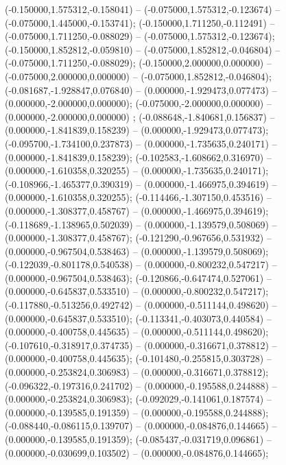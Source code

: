  (-0.150000,1.575312,-0.158041) -- (-0.075000,1.575312,-0.123674) -- (-0.075000,1.445000,-0.153741);
 (-0.150000,1.711250,-0.112491) -- (-0.075000,1.711250,-0.088029) -- (-0.075000,1.575312,-0.123674);
 (-0.150000,1.852812,-0.059810) -- (-0.075000,1.852812,-0.046804) -- (-0.075000,1.711250,-0.088029);
 (-0.150000,2.000000,0.000000) -- (-0.075000,2.000000,0.000000) -- (-0.075000,1.852812,-0.046804);
 (-0.081687,-1.928847,0.076840) -- (0.000000,-1.929473,0.077473) -- (0.000000,-2.000000,0.000000);
 (-0.075000,-2.000000,0.000000) -- (0.000000,-2.000000,0.000000) ;
 (-0.088648,-1.840681,0.156837) -- (0.000000,-1.841839,0.158239) -- (0.000000,-1.929473,0.077473);
 (-0.095700,-1.734100,0.237873) -- (0.000000,-1.735635,0.240171) -- (0.000000,-1.841839,0.158239);
 (-0.102583,-1.608662,0.316970) -- (0.000000,-1.610358,0.320255) -- (0.000000,-1.735635,0.240171);
 (-0.108966,-1.465377,0.390319) -- (0.000000,-1.466975,0.394619) -- (0.000000,-1.610358,0.320255);
 (-0.114466,-1.307150,0.453516) -- (0.000000,-1.308377,0.458767) -- (0.000000,-1.466975,0.394619);
 (-0.118689,-1.138965,0.502039) -- (0.000000,-1.139579,0.508069) -- (0.000000,-1.308377,0.458767);
 (-0.121290,-0.967656,0.531932) -- (0.000000,-0.967504,0.538463) -- (0.000000,-1.139579,0.508069);
 (-0.122039,-0.801178,0.540538) -- (0.000000,-0.800232,0.547217) -- (0.000000,-0.967504,0.538463);
 (-0.120866,-0.647474,0.527061) -- (0.000000,-0.645837,0.533510) -- (0.000000,-0.800232,0.547217);
 (-0.117880,-0.513256,0.492742) -- (0.000000,-0.511144,0.498620) -- (0.000000,-0.645837,0.533510);
 (-0.113341,-0.403073,0.440584) -- (0.000000,-0.400758,0.445635) -- (0.000000,-0.511144,0.498620);
 (-0.107610,-0.318917,0.374735) -- (0.000000,-0.316671,0.378812) -- (0.000000,-0.400758,0.445635);
 (-0.101480,-0.255815,0.303728) -- (0.000000,-0.253824,0.306983) -- (0.000000,-0.316671,0.378812);
 (-0.096322,-0.197316,0.241702) -- (0.000000,-0.195588,0.244888) -- (0.000000,-0.253824,0.306983);
 (-0.092029,-0.141061,0.187574) -- (0.000000,-0.139585,0.191359) -- (0.000000,-0.195588,0.244888);
 (-0.088440,-0.086115,0.139707) -- (0.000000,-0.084876,0.144665) -- (0.000000,-0.139585,0.191359);
 (-0.085437,-0.031719,0.096861) -- (0.000000,-0.030699,0.103502) -- (0.000000,-0.084876,0.144665);
